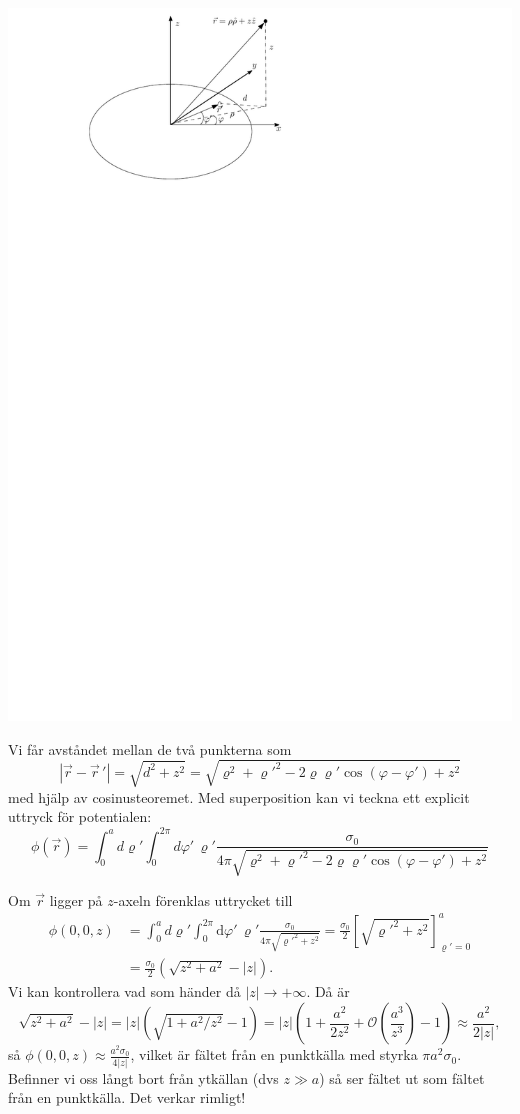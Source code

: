 \documentclass[%
oneside,                 %
final,                   %
10pt]{article}
\begin{document}
\centerline{\includegraphics[width=0.8\linewidth]{fig/ex6_4.pdf}}



Vi får avståndet mellan de två punkterna som
\begin{equation}
|\vec{r}-\vec{r}\,'|
= \sqrt{d^2 + z^2}
=\sqrt{\varrho^2+\varrho'^2-2\varrho\varrho'\cos(\varphi-\varphi')+z^2}
\end{equation}
med hjälp av cosinusteoremet.
Med superposition kan vi teckna ett explicit uttryck för potentialen:
\begin{equation}
\phi(\vec{r})=\int_0^a d\varrho'\int_0^{2\pi}d\varphi'\,
\varrho'\frac{\sigma_0}{4\pi \sqrt{\varrho^2+\varrho'^2-2\varrho\varrho'\cos(\varphi-\varphi')+z^2}}
\end{equation}

Om $\vec{r}$ ligger på $z$-axeln förenklas uttrycket till
\begin{align}
\phi(0,0,z) &= \int_0^a d\varrho'\int_0^{2\pi}\mbox{d}\varphi'\,
\varrho'\frac{\sigma_0}{4\pi \sqrt{\varrho'^2+z^2}}
=\frac{\sigma_0}{2}\left[\sqrt{\varrho'^2+z^2}\right]_{\varrho'=0}^a \\ 
&=\frac{\sigma_0}{2}\left(\sqrt{z^2+a^2}-|z|\right).
\end{align}
Vi kan kontrollera vad som händer då $|z|\rightarrow+\infty$. Då är 
\begin{equation}
\sqrt{z^2+a^2}-|z|=|z|(\sqrt{1+a^2/z^2}-1) = |z|
\left( 1+\frac{a^2}{2z^2}+\mathcal{O}(\frac{a^3}{z^3})-1\right) \approx \frac{a^2}{2|z|},
\end{equation}
så $\phi(0,0,z)\approx \frac{a^2\sigma_0}{4|z|}$, vilket är fältet från en punktkälla med styrka $\pi a^2\sigma_0$. Befinner vi oss långt bort från ytkällan (dvs $z \gg a$) så ser fältet ut som fältet från en punktkälla. Det verkar rimligt!
\end{document}
